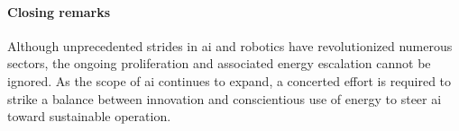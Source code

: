 \documentclass[12pt]{article}
\newcommand\myhl[1]{\textcolor{blue}{#1}}
\begin{document}


\paragraph*{Closing remarks}
Although unprecedented strides in \ac{ai} and robotics have revolutionized numerous sectors, the ongoing proliferation and associated energy escalation cannot be ignored. As the scope of \ac{ai} continues to expand, a concerted effort is required to strike a balance between innovation and conscientious use of energy to steer \ac{ai} toward sustainable operation.
\end{document}
